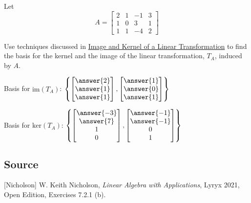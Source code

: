 \documentclass{ximera}
\author{}
\begin{document}
\begin{exercise}
Let $$A=\begin{bmatrix}2 & 1 & -1 & 3\\1 & 0 & 3 & 1\\1 & 1 & -4 & 2\end{bmatrix}$$ 

Use techniques discussed in \href{https://ximera.osu.edu/linearalgebrav3/LinearAlgebraInteractiveIntro/LTR-0050/main}{Image and Kernel of a Linear Transformation} to find the basis for the kernel and the image of the linear transformation, $T_A$, induced by $A$.

Basis for $\mbox{im}(T_A)$: $\left\{\begin{bmatrix}\answer{2}\\\answer{1}\\\answer{1}\end{bmatrix}, \begin{bmatrix}\answer{1}\\\answer{0}\\\answer{1}\end{bmatrix}\right\}$

Basis for $\mbox{ker}(T_A)$: $\left\{\begin{bmatrix}\answer{-3}\\\answer{7}\\1\\0\end{bmatrix}, \begin{bmatrix}\answer{-1}\\\answer{-1}\\0\\1\end{bmatrix}\right\}$

 \end{exercise}

 \subsection*{Source}
[Nicholson] W. Keith Nicholson, {\it Linear Algebra with Applications}, Lyryx 2021, Open Edition, Exercises 7.2.1 (b). 
 
\end{document}
